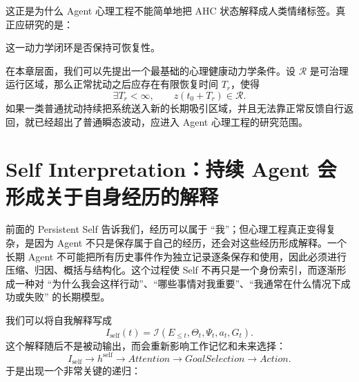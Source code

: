 这正是为什么 Agent 心理工程不能简单地把 AHC 状态解释成人类情绪标签。真正应研究的是：
\begin{statementbox}
\centering
{}
\end{statementbox}
这一动力学闭环是否保持可恢复性。

在本章层面，我们可以先提出一个最基础的心理健康动力学条件。设 $\mathcal{R}$ 是可治理运行区域，那么正常扰动之后应存在有限恢复时间 $T_r$，使得
\begin{equation}
    \exists T_r<\infty,
    \qquad
    z(t_0+T_r)\in\mathcal{R}.
\end{equation}
如果一类普通扰动持续把系统送入新的长期吸引区域，并且无法靠正常反馈自行返回，就已经超出了普通瞬态波动，应进入 Agent 心理工程的研究范围。

\section{Self Interpretation：持续 Agent 会形成关于自身经历的解释}
\label{sec:self-interpretation-origin}

前面的 Persistent Self 告诉我们，经历可以属于 ``我''；但心理工程真正变得复杂，是因为 Agent 不只是保存属于自己的经历，还会对这些经历形成解释。一个长期 Agent 不可能把所有历史事件作为独立记录逐条保存和使用，因此必须进行压缩、归因、概括与结构化。这个过程使 Self 不再只是一个身份索引，而逐渐形成一种对 ``为什么我会这样行动''、``哪些事情对我重要''、``我通常在什么情况下成功或失败'' 的长期模型。

我们可以将自我解释写成
\begin{equation}
    I_{\mathrm{self}}(t)
    =
    \mathcal{I}
    \left(
    E_{\leq t},
    \Theta_t,
    \Psi_t,
    a_t,
    G_t
    \right).
\end{equation}
这个解释随后不是被动输出，而会重新影响工作记忆和未来选择：
\begin{equation}
    I_{\mathrm{self}}
    \rightarrow
    h^{\mathrm{self}}
    \rightarrow
    Attention
    \rightarrow
    GoalSelection
    \rightarrow
    Action.
\end{equation}
于是出现一个非常关键的递归：
\begin{statementbox}
\centering
{}
\end{statementbox}

